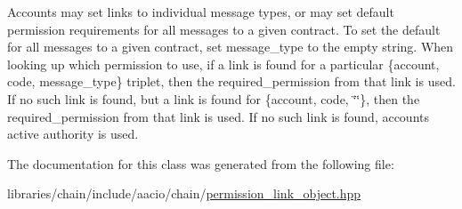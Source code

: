 Accounts may set links to individual message types, or may set default permission requirements for all messages to a given contract. To set the default for all messages to a given contract, set message\+\_\+type to the empty string. When looking up which permission to use, if a link is found for a particular \{account, code, message\+\_\+type\} triplet, then the required\+\_\+permission from that link is used. If no such link is found, but a link is found for \{account, code, \char`\"{}\char`\"{}\}, then the required\+\_\+permission from that link is used. If no such link is found, account\textquotesingle{}s active authority is used. 

The documentation for this class was generated from the following file\+:\begin{DoxyCompactItemize}
\item 
libraries/chain/include/aacio/chain/\mbox{\hyperlink{permission__link__object_8hpp}{permission\+\_\+link\+\_\+object.\+hpp}}\end{DoxyCompactItemize}
